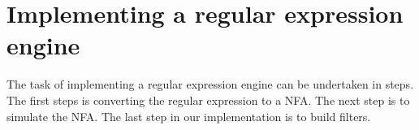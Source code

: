 \section{Implementing a regular expression engine}
\label{sec:implementation}
The task of implementing a regular expression engine can be undertaken
in steps. The first steps is converting the regular expression to a
NFA. The next step is to simulate the NFA. The last step in our
implementation is to build filters.




